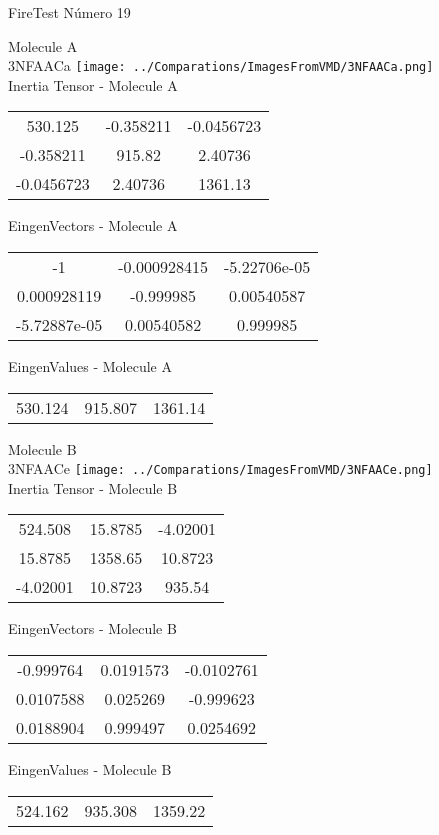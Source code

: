 \vtab[-2cm]
\begin{center}
{\large FireTest \tab Número 19}
\end{center}
\begin{multicols}{2}
\begin{center}

Molecule A \\ 
3NFAACa
\texttt{[image: ../Comparations/ImagesFromVMD/3NFAACa.png]}
\\
Inertia Tensor - Molecule A \\
\vtab

\begin{tabular}{|c c c|}
530.125	 & 	-0.358211	 & 	-0.0456723	 \\
-0.358211	 & 	915.82	 & 	2.40736	 \\
-0.0456723	 & 	2.40736	 & 	1361.13
\end{tabular}

\vtab
 EingenVectors - Molecule A     \\
\vtab
\begin{tabular}{|c c c|}
-1	 & 	-0.000928415	 & 	-5.22706e-05	 \\
0.000928119	 & 	-0.999985	 & 	0.00540587	 \\
-5.72887e-05	 & 	0.00540582	 & 	0.999985
\end{tabular}

\vtab
 EingenValues - Molecule A     \\
\vtab
\begin{tabular}{|c c c|}
530.124	 & 	915.807	 & 	1361.14	 \\
\end{tabular}
\columnbreak

Molecule B \\ 
3NFAACe
\texttt{[image: ../Comparations/ImagesFromVMD/3NFAACe.png]}
\\
Inertia Tensor - Molecule B \\
\vtab

\begin{tabular}{|c c c|}
524.508	 & 	15.8785	 & 	-4.02001	 \\
15.8785	 & 	1358.65	 & 	10.8723	 \\
-4.02001	 & 	10.8723	 & 	935.54
\end{tabular}

\vtab
 EingenVectors - Molecule B     \\
\vtab
\begin{tabular}{|c c c|}
-0.999764	 & 	0.0191573	 & 	-0.0102761	 \\
0.0107588	 & 	0.025269	 & 	-0.999623	 \\
0.0188904	 & 	0.999497	 & 	0.0254692
\end{tabular}

\vtab
 EingenValues - Molecule B     \\
\vtab
\begin{tabular}{|c c c|}
524.162	 & 	935.308	 & 	1359.22	 \\
\end{tabular}

\end{center}
\end{multicols}
